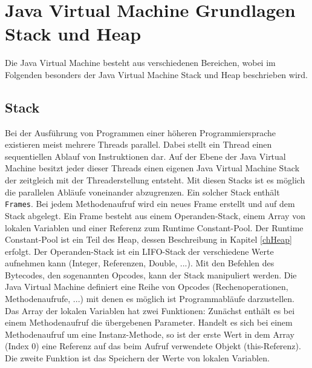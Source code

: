 \documentclass[conference]{IEEEtran}
\begin{document}
\section{Java Virtual Machine Grundlagen Stack und Heap}

Die Java Virtual Machine besteht aus verschiedenen Bereichen, wobei im Folgenden besonders der Java Virtual Machine Stack und Heap beschrieben wird.

\subsection{Stack}
Bei der Ausführung von Programmen einer höheren Programmiersprache existieren meist mehrere Threads parallel. Dabei stellt ein Thread einen sequentiellen Ablauf von Instruktionen dar. Auf der Ebene der Java Virtual Machine besitzt jeder dieser Threads einen eigenen Java Virtual Machine Stack der zeitgleich mit der Threaderstellung entsteht. Mit diesen Stacks ist es möglich die parallelen Abläufe voneinander abzugrenzen. Ein solcher Stack enthält \verb|Frames|. Bei jedem Methodenaufruf wird ein neues Frame erstellt und auf dem Stack abgelegt. Ein Frame besteht aus einem Operanden-Stack, einem Array von lokalen Variablen und einer Referenz zum Runtime Constant-Pool. Der Runtime Constant-Pool ist ein Teil des Heap, dessen Beschreibung in Kapitel \ref{chHeap} erfolgt. Der Operanden-Stack ist ein LIFO-Stack der verschiedene Werte aufnehmen kann (Integer, Referenzen, Double, ...). Mit den Befehlen des Bytecodes, den sogenannten Opcodes, kann der Stack manipuliert werden. Die Java Virtual Machine definiert eine Reihe von Opcodes (Rechenoperationen, Methodenaufrufe, ...) mit denen es möglich ist Programmabläufe darzustellen. Das Array der lokalen Variablen hat zwei Funktionen: Zunächst enthält es bei einem Methodenaufruf die übergebenen Parameter. Handelt es sich bei einem Methodenaufruf um eine Instanz-Methode, so ist der erste Wert in dem Array (Index 0) eine Referenz auf das beim Aufruf verwendete Objekt (this-Referenz). Die zweite Funktion ist das Speichern der Werte von lokalen Variablen. 
\end{document}
